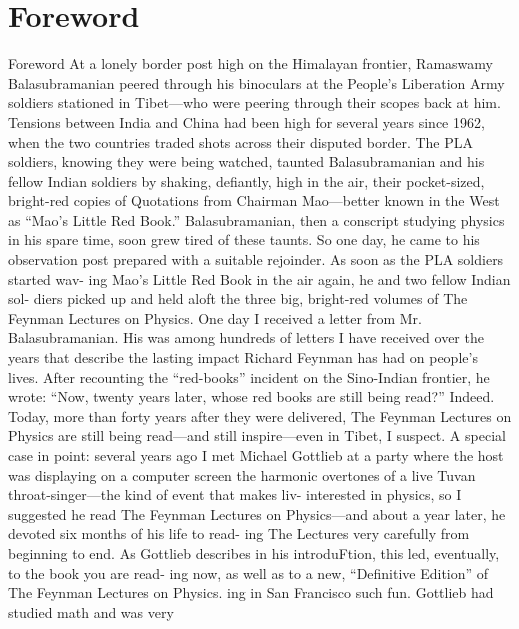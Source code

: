 \documentclass[11pt,oneside]{article}
\begin{document}
\clearpage


\section*{Foreword}



\label{tips-sec-2-foreword}


Foreword At a lonely border post high on the Himalayan frontier, Ramaswamy Balasubramanian peered through his binoculars at the People’s Liberation Army soldiers stationed in Tibet---who were peering through their scopes back at him. Tensions between India and China had been high for several years since 1962, when the two countries traded shots across their disputed border. The PLA soldiers, knowing they were being watched, taunted Balasubramanian and his fellow Indian soldiers by shaking, defiantly, high in the air, their pocket-sized, bright-red copies of Quotations from Chairman Mao---better known in the West as “Mao’s Little Red Book.” Balasubramanian, then a conscript studying physics in his spare time, soon grew tired of these taunts. So one day, he came to his observation post prepared with a suitable rejoinder. As soon as the PLA soldiers started wav- ing Mao’s Little Red Book in the air again, he and two fellow Indian sol- diers picked up and held aloft the three big, bright-red volumes of The Feynman Lectures on Physics. One day I received a letter from Mr. Balasubramanian. His was among hundreds of letters I have received over the years that describe the lasting impact Richard Feynman has had on people’s lives. After recounting the “red-books” incident on the Sino-Indian frontier, he wrote: “Now, twenty years later, whose red books are still being read?” Indeed. Today, more than forty years after they were delivered, The Feynman Lectures on Physics are still being read---and still inspire---even in Tibet, I suspect. A special case in point: several years ago I met Michael Gottlieb at a party where the host was displaying on a computer screen the harmonic overtones of a live Tuvan throat-singer---the kind of event that makes liv- interested in physics, so I suggested he read The Feynman Lectures on Physics---and about a year later, he devoted six months of his life to read- ing The Lectures very carefully from beginning to end. As Gottlieb describes in his introduFtion, this led, eventually, to the book you are read- ing now, as well as to a new, “Definitive Edition” of The Feynman Lectures on Physics. ing in San Francisco such fun. Gottlieb had studied math and was very\par
\end{document}
